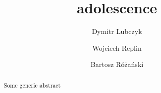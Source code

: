 \documentclass[a4paper]{article}
\title{adolescence}
\author{Dymitr Lubczyk \and Wojciech Replin \and Bartosz Różański}
\begin{document}
\maketitle
\begin{abstract}
Some generic abstract
\end{abstract}
\newpage
\tableofcontents
\newpage

\newpage

\end{document}
